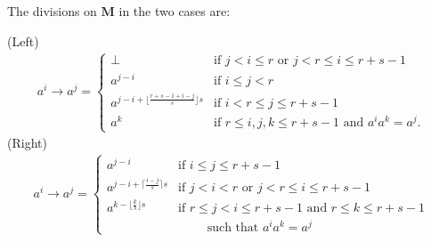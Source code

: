 \documentclass[professionalfont, handout, 10pt]{beamer} %
\theoremstyle{plain}
\theoremstyle{definition}
\newcommand{\m}[1]{{\mathbf {#1} }}
\begin{document}
\begin{frame}
    The divisions on $\m M$ in the two cases are:

    (Left)
    \begin{align*}
    a^i \rightarrow a^j =
    \begin{cases}
        \bot & \text{if } j < i \leq r  \text{ or } j< r \leq i \leq r+s-1\\
        a^{j-i} & \text{if } i \leq j < r\\
        a^{j-i+\lfloor \frac{r+s-1+i-j}{s} \rfloor s} & \text{if } i < r \leq j \leq r+s-1\\
        a^k & \text{if }  r \leq i, j, k \leq r+s-1 \text{ and } a^i a^k = a^j.
    \end{cases}
    \end{align*}
    (Right)
    \begin{align*}
    a^i \rightarrow a^j =
    \begin{cases}
        a^{j-i} & \text{if } i \leq j \leq r+s-1\\
        a^{j-i+\lceil \frac{i-j}{s} \rceil s} & \text{if } j < i < r \text{ or }  j < r \leq i \leq r+s-1\\
        a^{k-\lfloor \frac{k}{s} \rfloor s} & \text{if } r \leq j < i \leq r+s-1 \text{ and } r \leq k \leq r+s-1\\
                & \qquad \text{ such that } a^i a^k = a^j
    \end{cases}
    \end{align*}
\end{frame}
\end{document}
